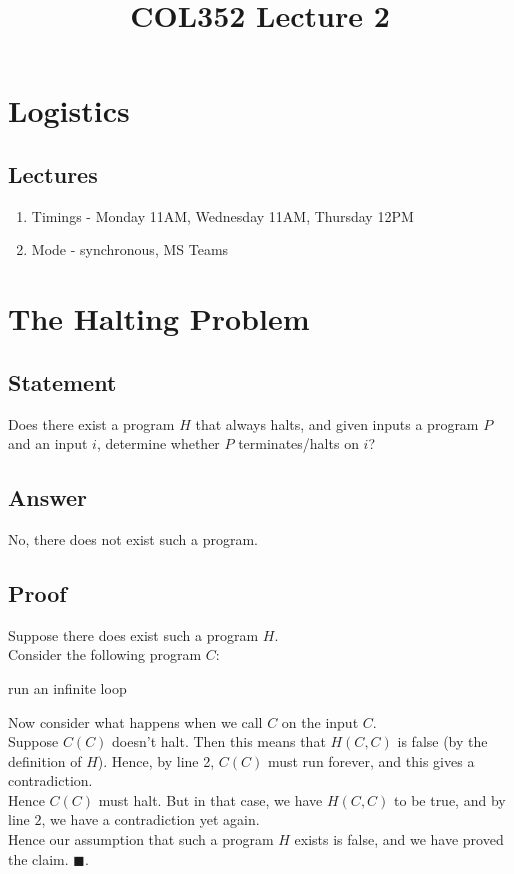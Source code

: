 \documentclass[a4paper]{article}
\title{\textbf{COL352 Lecture 2}}
\date{}
\newcommand{\nl}{\vspace{0.2cm}\\}
\begin{document}
\maketitle
\tableofcontents

\iffalse

\section{Logistics}
\subsection{Lectures}
\begin{enumerate}
    \item Timings - Monday 11AM, Wednesday 11AM, Thursday 12PM
    \item Mode - synchronous, MS Teams
\end{enumerate}
\section{The Halting Problem}
\subsection{Statement}
Does there exist a program $H$ that always halts, and given inputs a program $P$ and an input $i$, determine whether $P$ terminates/halts on $i$?
\subsection{Answer}
No, there does not exist such a program.
\subsection{Proof}
Suppose there does exist such a program $H$.\nl
Consider the following program $C$:
\begin{algorithmic}[1]
            \State run an infinite loop
        \Else
            \State \Return
        \EndIf
    \EndFunction
\end{algorithmic}
Now consider what happens when we call $C$ on the input $C$.\nl
Suppose $C(C)$ doesn't halt. Then this means that $H(C, C)$ is false (by the definition of $H$).
Hence, by line 2, $C(C)$ must run forever, and this gives a contradiction.\nl
Hence $C(C)$ must halt. But in that case, we have $H(C, C)$ to be true, and by line $2$, we have a contradiction yet again.\nl
Hence our assumption that such a program $H$ exists is false, and we have proved the claim. $\blacksquare$.
\end{document}
